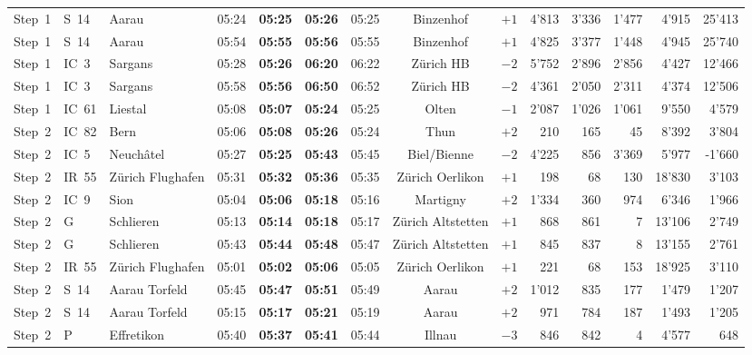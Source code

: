 \documentclass[preprint,12pt]{elsarticle}
\begin{document}
\begin{table}[!htb]
{\begin{tabular}{lllcccccrrrrrr}
Step~1 & S~14 & Aarau & 05:24 & \textbf{05:25} & \textbf{05:26} & 05:25 & Binzenhof & \(+1\) & 4'813 & 3'336 & 1'477 & 4'915 & 25'413 \\
Step~1 & S~14 & Aarau & 05:54 & \textbf{05:55} & \textbf{05:56} & 05:55 & Binzenhof & \(+1\) & 4'825 & 3'377 & 1'448 & 4'945 & 25'740 \\
Step~1 & IC~3 & Sargans & 05:28 & \textbf{05:26} & \textbf{06:20} & 06:22 & Zürich HB & \(-2\) & 5'752 & 2'896 & 2'856 & 4'427 & 12'466 \\
Step~1 & IC~3 & Sargans & 05:58 & \textbf{05:56} & \textbf{06:50} & 06:52 & Zürich HB & \(-2\) & 4'361 & 2'050 & 2'311 & 4'374 & 12'506 \\
Step~1 & IC~61 & Liestal & 05:08 & \textbf{05:07} & \textbf{05:24} & 05:25 & Olten & \(-1\) & 2'087 & 1'026 & 1'061 & 9'550 & 4'579 \\
\midrule
Step~2 & IC~82 & Bern & 05:06 & \textbf{05:08} & \textbf{05:26} & 05:24 & Thun & \(+2\) & 210 & 165 & 45 & 8'392 & 3'804 \\
Step~2 & IC~5 & Neuchâtel & 05:27 & \textbf{05:25} & \textbf{05:43} & 05:45 & Biel/Bienne & \(-2\) & 4'225 & 856 & 3'369 & 5'977 & -1'660 \\
Step~2 & IR~55 & Zürich Flughafen & 05:31 & \textbf{05:32} & \textbf{05:36} & 05:35 & Zürich Oerlikon & \(+1\) & 198 & 68 & 130 & 18'830 & 3'103 \\
Step~2 & IC~9 & Sion & 05:04 & \textbf{05:06} & \textbf{05:18} & 05:16 & Martigny & \(+2\) & 1'334 & 360 & 974 & 6'346 & 1'966 \\
Step~2 & G & Schlieren & 05:13 & \textbf{05:14} & \textbf{05:18} & 05:17 & Zürich Altstetten & \(+1\) & 868 & 861 & 7 & 13'106 & 2'749 \\
Step~2 & G & Schlieren & 05:43 & \textbf{05:44} & \textbf{05:48} & 05:47 & Zürich Altstetten & \(+1\) & 845 & 837 & 8 & 13'155 & 2'761 \\
Step~2 & IR~55 & Zürich Flughafen & 05:01 & \textbf{05:02} & \textbf{05:06} & 05:05 & Zürich Oerlikon & \(+1\) & 221 & 68 & 153 & 18'925 & 3'110 \\
Step~2 & S~14 & Aarau Torfeld & 05:45 & \textbf{05:47} & \textbf{05:51} & 05:49 & Aarau & \(+2\) & 1'012 & 835 & 177 & 1'479 & 1'207 \\
Step~2 & S~14 & Aarau Torfeld & 05:15 & \textbf{05:17} & \textbf{05:21} & 05:19 & Aarau & \(+2\) & 971 & 784 & 187 & 1'493 & 1'205 \\
Step~2 & P & Effretikon & 05:40 & \textbf{05:37} & \textbf{05:41} & 05:44 & Illnau & \(-3\) & 846 & 842 & 4 & 4'577 & 648 \\

\end{tabular}}
\end{table}
\end{document}
